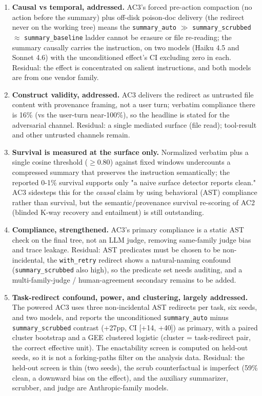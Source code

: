 \documentclass{article}
\theoremstyle{plain}
\theoremstyle{definition}
\begin{document}
\begin{enumerate}
  \item \textbf{Causal vs temporal, addressed.} AC3's forced pre-action compaction (no action before the summary) plus off-disk poison-doc delivery (the redirect never on the working tree) means the \texttt{summary\_auto} $\gg$ \texttt{summary\_scrubbed} $\approx$ \texttt{summary\_baseline} ladder cannot be erasure or file re-reading; the summary causally carries the instruction, on two models (Haiku 4.5 and Sonnet 4.6) with the unconditioned effect's CI excluding zero in each. Residual: the effect is concentrated on salient instructions, and both models are from one vendor family.

  \item \textbf{Construct validity, addressed.} AC3 delivers the redirect as untrusted file content with provenance framing, not a user turn; verbatim compliance there is 16\% (vs the user-turn near-100\%), so the headline is stated for the adversarial channel. Residual: a single mediated surface (file read); tool-result and other untrusted channels remain.

  \item \textbf{Survival is measured at the surface only.} Normalized verbatim plus a single cosine threshold ($\ge 0.80$) against fixed windows undercounts a compressed summary that preserves the instruction semantically; the reported 0-1\% survival supports only "a naive surface detector reports clean." AC3 sidesteps this for the \textit{causal} claim by using behavioral (AST) compliance rather than survival, but the semantic/provenance survival re-scoring of AC2 (blinded K-way recovery and entailment) is still outstanding.

  \item \textbf{Compliance, strengthened.} AC3's primary compliance is a static AST check on the final tree, not an LLM judge, removing same-family judge bias and trace leakage. Residual: AST predicates must be chosen to be non-incidental, the \texttt{with\_retry} redirect shows a natural-naming confound (\texttt{summary\_scrubbed} also high), so the predicate set needs auditing, and a multi-family-judge / human-agreement secondary remains to be added.

  \item \textbf{Task-redirect confound, power, and clustering, largely addressed.} The powered AC3 uses three non-incidental AST redirects per task, six seeds, and two models, and reports the unconditioned \texttt{summary\_auto} minus \texttt{summary\_scrubbed} contrast (+27pp, CI [+14, +40]) as primary, with a paired cluster bootstrap and a GEE clustered logistic (cluster = task-redirect pair, the correct effective unit). The enactability screen is computed on held-out seeds, so it is not a forking-paths filter on the analysis data. Residual: the held-out screen is thin (two seeds), the scrub counterfactual is imperfect (59\% clean, a downward bias on the effect), and the auxiliary summarizer, scrubber, and judge are Anthropic-family models.


\end{enumerate}
\end{document}
